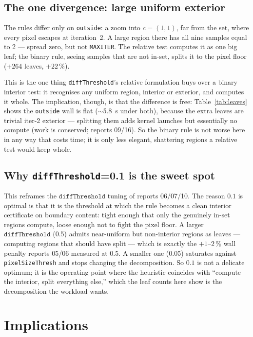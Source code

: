 \documentclass[
	english,
	letterpaper, oneside
]{article}
\begin{document}
\subsection{The one divergence: large uniform exterior}

The rules differ only on \texttt{outside}: a zoom into $c=(1,1)$, far from the
set, where every pixel escapes at iteration~2. A large region there has all nine
samples equal to 2 --- spread zero, but not \texttt{MAXITER}. The
relative test computes it as one big leaf; the binary rule, seeing samples that
are not in-set, splits it to the pixel floor ($+264$ leaves, $+22\,\%$).

This is the one thing \texttt{diffThreshold}'s relative formulation buys over a
binary interior test: it recognises any uniform region, interior or
exterior, and computes it whole. The implication, though, is that the difference
is free: Table~\ref{tab:leaves} shows the \texttt{outside} wall is flat
($\sim$5.8~s under both), because the extra leaves are trivial iter-2 exterior ---
splitting them adds kernel launches but essentially no compute (work is
conserved; reports 09/16). So the binary rule is not worse here in any way that
costs time; it is only less elegant, shattering regions a relative test
would keep whole.

\subsection{Why \texttt{diffThreshold}=0.1 is the sweet spot}

This reframes the $\texttt{diffThreshold}$ tuning of reports 06/07/10. The reason
$0.1$ is optimal is that it is the threshold at which the rule becomes a clean
interior certificate on boundary content: tight enough that only the genuinely
in-set regions compute, loose enough not to fight the pixel floor. A larger
$\texttt{diffThreshold}$ (0.5) admits near-uniform but non-interior regions as
leaves --- computing regions that should have split --- which is exactly the
$+1$--$2\,\%$ wall penalty reports 05/06 measured at 0.5. A smaller one (0.05)
saturates against \texttt{pixelSizeThresh} and stops changing the decomposition.
So $0.1$ is not a delicate optimum; it is the operating point where the heuristic
coincides with ``compute the interior, split everything else,'' which the leaf
counts here show is the decomposition the workload wants.

\section{Implications}
\end{document}
